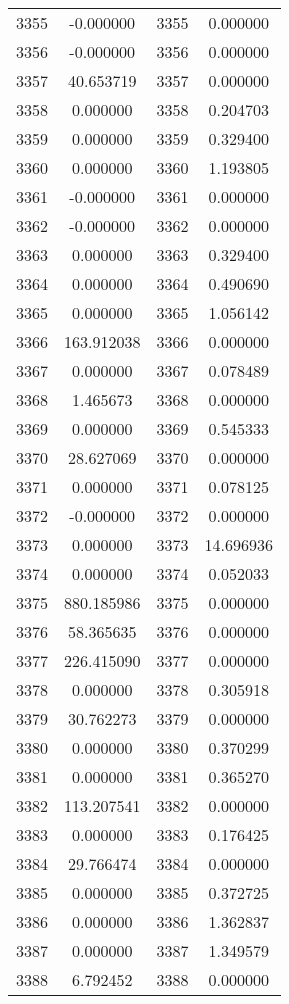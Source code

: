 \documentclass[12pt]{article}
\begin{document}
\begin{longtable}{@{}cccc@{}}
3355 & -0.000000 & 3355 & 0.000000 \\
3356 & -0.000000 & 3356 & 0.000000 \\
3357 & 40.653719 & 3357 & 0.000000 \\
3358 & 0.000000 & 3358 & 0.204703 \\
3359 & 0.000000 & 3359 & 0.329400 \\
3360 & 0.000000 & 3360 & 1.193805 \\
3361 & -0.000000 & 3361 & 0.000000 \\
3362 & -0.000000 & 3362 & 0.000000 \\
3363 & 0.000000 & 3363 & 0.329400 \\
3364 & 0.000000 & 3364 & 0.490690 \\
3365 & 0.000000 & 3365 & 1.056142 \\
3366 & 163.912038 & 3366 & 0.000000 \\
3367 & 0.000000 & 3367 & 0.078489 \\
3368 & 1.465673 & 3368 & 0.000000 \\
3369 & 0.000000 & 3369 & 0.545333 \\
3370 & 28.627069 & 3370 & 0.000000 \\
3371 & 0.000000 & 3371 & 0.078125 \\
3372 & -0.000000 & 3372 & 0.000000 \\
3373 & 0.000000 & 3373 & 14.696936 \\
3374 & 0.000000 & 3374 & 0.052033 \\
3375 & 880.185986 & 3375 & 0.000000 \\
3376 & 58.365635 & 3376 & 0.000000 \\
3377 & 226.415090 & 3377 & 0.000000 \\
3378 & 0.000000 & 3378 & 0.305918 \\
3379 & 30.762273 & 3379 & 0.000000 \\
3380 & 0.000000 & 3380 & 0.370299 \\
3381 & 0.000000 & 3381 & 0.365270 \\
3382 & 113.207541 & 3382 & 0.000000 \\
3383 & 0.000000 & 3383 & 0.176425 \\
3384 & 29.766474 & 3384 & 0.000000 \\
3385 & 0.000000 & 3385 & 0.372725 \\
3386 & 0.000000 & 3386 & 1.362837 \\
3387 & 0.000000 & 3387 & 1.349579 \\
3388 & 6.792452 & 3388 & 0.000000 \\

\end{longtable}
\end{document}

